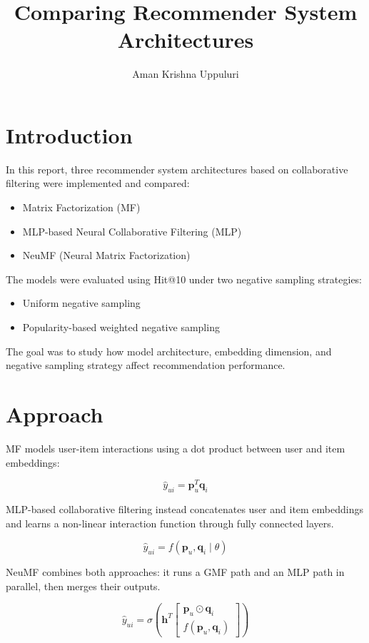 \documentclass{article}
\title{Comparing Recommender System Architectures}
\author{Aman Krishna Uppuluri}
\date{}
\begin{document}
\maketitle

\section{Introduction}

In this report, three recommender system architectures based on collaborative filtering were implemented and compared:

\begin{itemize}
    \item Matrix Factorization (MF)
    \item MLP-based Neural Collaborative Filtering (MLP)
    \item NeuMF (Neural Matrix Factorization)
\end{itemize}

The models were evaluated using Hit@10 under two negative sampling strategies:

\begin{itemize}
    \item Uniform negative sampling
    \item Popularity-based weighted negative sampling
\end{itemize}

The goal was to study how model architecture, embedding dimension, and negative sampling strategy affect recommendation performance.

\section{Approach}

MF models user-item interactions using a dot product between user and item embeddings:

\[
\hat{y}_{ui} = \mathbf{p}_u^T \mathbf{q}_i
\]

MLP-based collaborative filtering instead concatenates user and item embeddings and learns a non-linear interaction function through fully connected layers.

\[
\hat{y}_{ui} = f(\mathbf{p}_u, \mathbf{q}_i \mid \theta)
\]

NeuMF combines both approaches: it runs a GMF path and an MLP path in parallel, then merges their outputs.

\[
\hat{y}_{ui} = \sigma \left( \mathbf{h}^T 
\begin{bmatrix}
\mathbf{p}_u \odot \mathbf{q}_i \\
f(\mathbf{p}_u, \mathbf{q}_i)
\end{bmatrix}
\right)
\]
\end{document}
